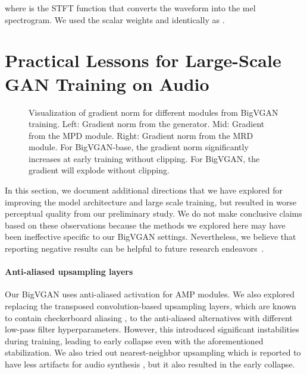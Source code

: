 \documentclass{article} \usepackage{iclr2023_conference,times}
\theoremstyle{plain}
\theoremstyle{definition}
\theoremstyle{remark}
\begin{document}
where  is the STFT function that converts the waveform into the mel spectrogram. We used the scalar weights  and  identically as \citep{kong2020hifi}.





\section{Practical Lessons for Large-Scale GAN Training on Audio}
\label{appendix:practical}

\begin{figure}[h]
\centering
{}
\hspace{0.22cm}
\hspace{0.22cm}
\vspace*{-1em}
\caption{\footnotesize 
Visualization of gradient norm for different modules from BigVGAN training. Left: Gradient norm from the generator. Mid: Gradient from the MPD module. Right: Gradient norm from the MRD module.
For BigVGAN-base, the gradient norm significantly increases at early training without clipping.
For BigVGAN, the gradient will explode without clipping. }
\label{fig_grad_norm}
\end{figure}



In this section, we document additional directions that we have explored for improving the model architecture and large scale training, but resulted in worse perceptual quality from our preliminary study. We do not make conclusive claims based on these observations because the methods we explored here may have been ineffective specific to our BigVGAN settings. Nevertheless, we believe that reporting negative results can be helpful to future research endeavors~\citep{brock2018large}.
\paragraph{Anti-aliased upsampling layers} Our BigVGAN uses anti-aliased activation for AMP modules. We also explored replacing the transposed convolution-based upsampling layers, which are known to contain checkerboard aliasing \citep{odena2016deconvolution}, to the anti-aliased alternatives with different low-pass filter hyperparameters. However, this introduced significant instabilities during training, leading to early collapse even with the aforementioned stabilization. We also tried out nearest-neighbor upsampling which is reported to have less artifacts for audio synthesis \citep{pons2021upsampling}, but it also resulted in the early collapse.
\end{document}
